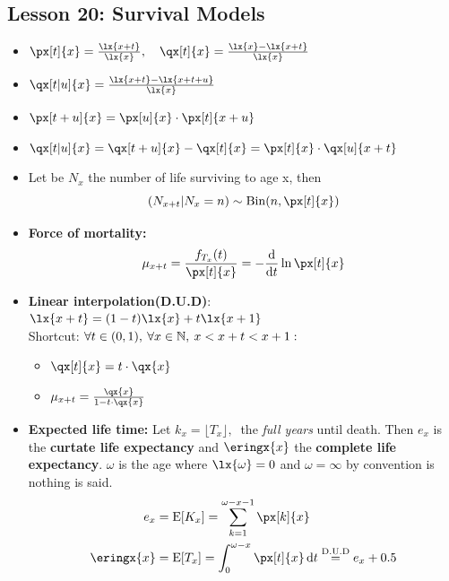 \documentclass[10pt, french]{article}
\begin{document}
\begin{multicols*}{3}
\section*{Lesson 20: Survival Models}
\begin{itemize}[align=left,leftmargin=*]
    \item $\px[t]{x} = \frac{\lx{x+t}}{\lx{x}},\quad \qx[t]{x}=\frac{\lx{x} - \lx{x+t}}{\lx{x}}$
    \item $\qx[t|u]{x}=\frac{\lx{x+t} - \lx{x+t+u} }{\lx{x}}$
    \item $\px[t+u]{x} = \px[u]{x} \cdot \px[t]{x+u}$
    \item $\qx[t|u]{x}=\qx[t+u]{x} - \qx[t]{x} = \px[t]{x}\cdot \qx[u]{x+t} $
    \item Let be $N_x$ the number of life surviving to age x, then  \[ (N_{x+t}|N_x=n)\sim\mathrm{Bin}(n, \px[t]{x}) \]
    \item \textbf{Force of mortality:} \[ \mu_{x+t} = \frac{f_{T_x}(t)}{\px[t]{x}} = - \frac{\diff}{\diff{t}} \ln \px[t]{x} \]
    \item \textbf{Linear interpolation(D.U.D)}:\\ \hspace*{1cm} $  \lx{x+t} = (1-t)\lx{x}+t \lx{x+1}$ \\  Shortcut: $\forall t \in (0,1),\: \forall x \in \mathbb{N},\: x<x+t<x+1:$
    \begin{minipage}{3cm}
        \vspace{.2cm}
        \begin{itemize}[align=left,leftmargin=*]
            \item[\ding{223}] $\qx[t]{x}=t\cdot \qx{x}$ 
            \item[\ding{223}] $\mu_{x+t}=\frac{\qx{x}}{1-t\cdot \qx{x}}$
        \end{itemize}
    \end{minipage}
    \item \textbf{Expected life time:} Let $k_x = \lfloor T_x \rfloor,\:$ the \emph{full years} until death. Then $e_x$ is the \textbf{curtate life expectancy} and $\eringx{x}$ the \textbf{complete life expectancy}. $\omega$ is the age where $\lx{\omega}=0$ and $\omega = \infty$ by convention is nothing is said.
    \begin{align*}
        e_x &= \esp{K_x} = \sum_{k=1}^{\omega-x-1} \px[k]{x} \\
        \eringx{x} &= \esp{T_x} = \int_0^{\omega-x} \px[t]{x} \diff{t} \stackrel{\text{D.U.D}}{=} e_x + 0.5
    \end{align*} 
\end{itemize}


\end{multicols*}
\end{document}

